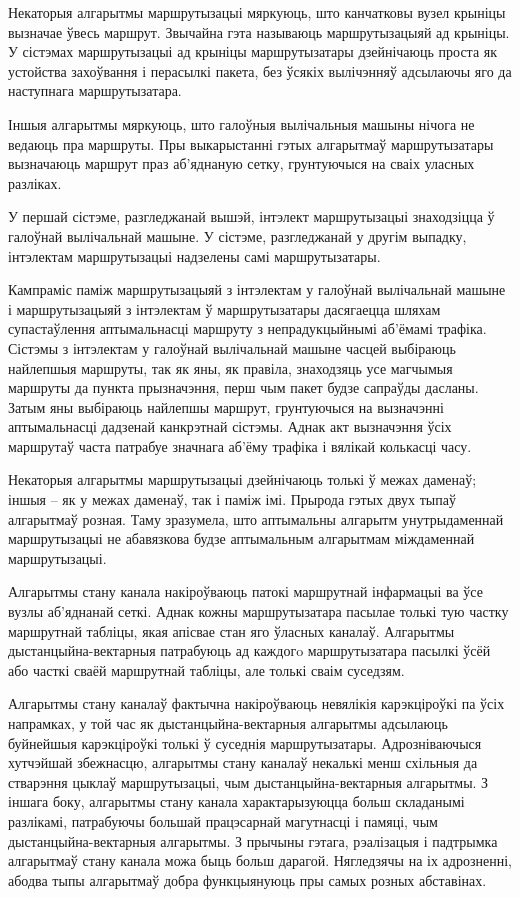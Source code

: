 Некаторыя алгарытмы маршрутызацыі мяркуюць, што канчатковы вузел крыніцы вызначае ўвесь маршрут. Звычайна гэта называюць маршрутызацыяй ад крыніцы. У сістэмах маршрутызацыі ад крыніцы маршрутызатары дзейнічаюць проста як устойства захоўвання і перасылкі пакета, без ўсякіх вылічэнняў адсылаючы яго да наступнага маршрутызатара.

Іншыя алгарытмы мяркуюць, што галоўныя вылічальныя машыны нічога не ведаюць пра маршруты. Пры выкарыстанні гэтых алгарытмаў маршрутызатары вызначаюць маршрут праз аб'яднаную сетку, грунтуючыся на сваіх уласных разліках.

У першай сістэме, разгледжанай вышэй, інтэлект маршрутызацыі знаходзіцца ў галоўнай вылічальнай машыне. У сістэме, разгледжанай у другім выпадку, інтэлектам маршрутызацыі надзелены самі маршрутызатары.

Кампраміс паміж маршрутызацыяй з інтэлектам у галоўнай
вылічальнай машыне і маршрутызацыяй з інтэлектам ў маршрутызатары дасягаецца шляхам супастаўлення аптымальнасці маршруту з непрадукцыйнымі аб'ёмамі трафіка. Сістэмы з інтэлектам у галоўнай вылічальнай машыне часцей выбіраюць найлепшыя маршруты, так як яны, як правіла, знаходзяць усе магчымыя маршруты да пункта прызначэння, перш чым пакет будзе сапраўды дасланы. Затым яны выбіраюць найлепшы маршрут, грунтуючыся на вызначэнні аптымальнасці дадзенай канкрэтнай сістэмы. Аднак акт вызначэння ўсіх маршрутаў часта патрабуе значнага аб'ёму трафіка і вялікай колькасці часу.

Некаторыя алгарытмы маршрутызацыі дзейнічаюць толькі ў межах даменаў; іншыя -- як у межах даменаў, так і паміж імі. Прырода гэтых двух тыпаў алгарытмаў розная. Таму зразумела, што аптымальны алгарытм унутрыдаменнай маршрутызацыі не абавязкова будзе аптымальным
алгарытмам міждаменнай маршрутызацыі.

Алгарытмы стану канала накіроўваюць патокі маршрутнай інфармацыі ва ўсе вузлы аб'яднанай сеткі. Аднак кожны маршрутызатара пасылае толькі тую частку маршрутнай табліцы, якая апісвае стан яго ўласных каналаў. Алгарытмы дыстанцыйна-вектарныя патрабуюць ад каждогo маршрутызатара пасылкі ўсёй або часткі сваёй маршрутнай табліцы, але толькі сваім суседзям.

Алгарытмы стану каналаў фактычна накіроўваюць невялікія карэкціроўкі па ўсіх напрамках, у той час як дыстанцыйна-вектарныя алгарытмы адсылаюць буйнейшыя карэкціроўкі толькі ў суседнія маршрутызатары.
Адрозніваючыся хутчэйшай збежнасцю, алгарытмы стану каналаў некалькі менш схільныя да стварэння цыклаў маршрутызацыі, чым дыстанцыйна-вектарныя алгарытмы. З іншага боку, алгарытмы стану канала характарызуюцца больш складанымі разлікамі, патрабуючы большай працэсарнай магутнасці і памяці, чым дыстанцыйна-вектарныя алгарытмы. З прычыны гэтага, рэалізацыя і падтрымка алгарытмаў стану канала можа быць больш дарагой. Нягледзячы на іх адрозненні, абодва тыпы алгарытмаў добра функцыянуюць пры самых розных абставінах.

